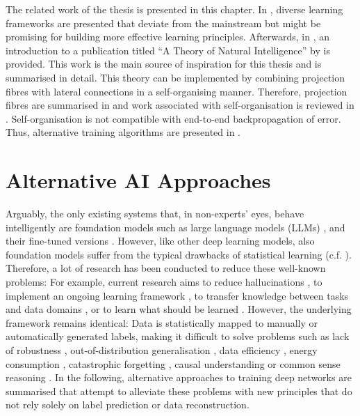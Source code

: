 The related work of the thesis is presented in this chapter. In , diverse learning frameworks are presented that deviate from the mainstream but might be promising for building more effective learning principles. Afterwards, in , an introduction to a publication titled ``A Theory of Natural Intelligence'' by  is provided. This work is the main source of inspiration for this thesis and is summarised in detail.
This theory can be implemented by combining projection fibres with lateral connections in a self-organising manner. Therefore, projection fibres are summarised in  and work associated with self-organisation is reviewed in . Self-organisation is not compatible with end-to-end backpropagation of error. Thus, alternative training algorithms are presented in .


\section{Alternative AI Approaches}
Arguably, the only existing systems that, in non-experts' eyes, behave intelligently are foundation models such as large language models (LLMs) , and their fine-tuned versions . However, like other deep learning models, also foundation models suffer from the typical drawbacks of statistical learning (c.f. ). Therefore, a lot of research has been conducted to reduce these well-known problems: For example, current research aims to reduce hallucinations , to implement an ongoing learning framework , to transfer knowledge between tasks and data domains , or to learn what should be learned \cite{thrun_introduction_1998, hospedales_meta-learning_2022}. However, the underlying framework remains identical: Data is statistically mapped to manually or automatically generated labels, making it difficult to solve problems such as lack of robustness \cite{akhtar_threat_2018, long_survey_2022},  out-of-distribution generalisation \cite{madan_when_2022}, data efficiency \cite{marcus_deep_2018, smith_using_2022}, energy consumption \cite{garcia-martin_estimation_2019}, catastrophic forgetting \cite{kirkpatrick_overcoming_2017}, causal understanding or common sense reasoning \cite{rosenbloom_defining_2023, mitchell_debate_2023}. In the following, alternative approaches to training deep networks are summarised that attempt to alleviate these problems with new principles that do not rely solely on label prediction or data reconstruction. 


